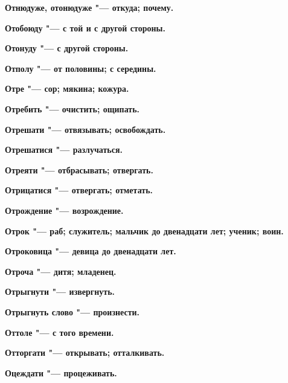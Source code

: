 \begin{mymulticols}{2}
\bfseries Отнюдуже, отонюдуже\normalfont{} "--- откуда; почему. 




\bfseries Отобоюду\normalfont{} "--- с той и с другой стороны. 




\bfseries Отонуду\normalfont{} "--- с другой стороны. 




\bfseries Отполу\normalfont{} "--- от половины; с середины. 




\bfseries Отре\normalfont{} "--- сор; мякина; кожура. 




\bfseries Отребить\normalfont{} "--- очистить; ощипать. 




\bfseries Отрешати\normalfont{} "--- отвязывать; освобождать. 




\bfseries Отрешатися\normalfont{} "--- разлучаться. 




\bfseries Отреяти\normalfont{} "--- отбрасывать; отвергать. 




\bfseries Отрицатися\normalfont{} "--- отвергать; отметать. 




\bfseries Отрождение\normalfont{} "--- возрождение. 




\bfseries Отрок\normalfont{} "--- раб; служитель; мальчик до двенадцати лет; ученик; воин. 




\bfseries Отроковица\normalfont{} "--- девица до двенадцати лет. 




\bfseries Отроча\normalfont{} "--- дитя; младенец. 




\bfseries Отрыгнути\normalfont{} "--- извергнуть. 




\bfseries Отрыгнуть слово\normalfont{} "--- произнести. 




\bfseries Оттоле\normalfont{} "--- с того времени. 




\bfseries Отторгати\normalfont{} "--- открывать; отталкивать. 




\bfseries Оцеждати\normalfont{} "--- процеживать. 





\end{mymulticols}

